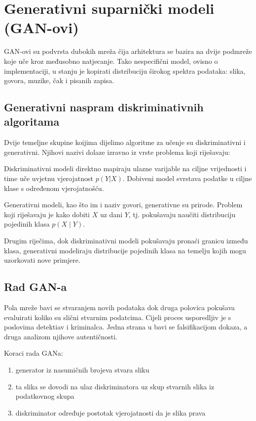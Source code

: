 \documentclass[lmodern, utf8, seminar]{fer}
\begin{document}
\chapter{Generativni suparnički modeli (GAN-ovi)}
GAN-ovi su podvrsta dubokih mreža čija arhitektura se bazira na dvije podmreže koje uče kroz međusobno natjecanje. Tako nespecifični model, ovisno o implementaciji, u stanju je kopirati distribuciju širokog spektra podataka: slika, govora, muzike, čak i pisanih zapisa.
\newline

\section{Generativni naspram diskriminativnih algoritama}
Dvije temeljne skupine koijima dijelimo algoritme za učenje su diskriminativni i generativni.
Njihovi nazivi dolaze izravno iz vrste problema koji riješavaju: 
\newline

Diskriminativni modeli direktno mapiraju ulazne varijable na ciljne vrijednosti i time uče uvjetnu vjerojatnost $p(Y|X)$. Dobiveni model svrstava podatke u ciljne klase s određenom vjerojatnošću.

Generativni modeli, kao što im i naziv govori, generativne su prirode. Problem koji riješavaju je kako dobiti $X$ uz dani $Y$, tj. pokušavaju naučiti distribuciju pojedinih klasa $p(X \mid Y)$.
\newline

Drugim riječima, dok diskriminativni modeli pokušavaju pronaći granicu između klasa, generativni modeliraju distribucije pojedinih klasa na temelju kojih mogu uzorkovati nove primjere.
\newline

\section{Rad GAN-a}
Pola mreže bavi se stvaranjem novih podataka dok druga polovica pokušava evaluirati koliko su slični stvarnim podatcima.
Cijeli proces usporedljiv je s poslovima detektiav i kriminalca. Jedna strana u bavi se falsifikacijom dokaza, a druga analizom njihove autentičnosti.
\newline

Koraci rada GANa:
\begin{enumerate} 
\item generator iz nasumičnih brojeva stvara sliku
\item ta slika se dovodi na ulaz diskriminatora uz skup stvarnih slika iz podatkovnog skupa
\item diskriminator određuje postotak vjerojatnosti da je slika prava
\end{enumerate}
\end{document}
